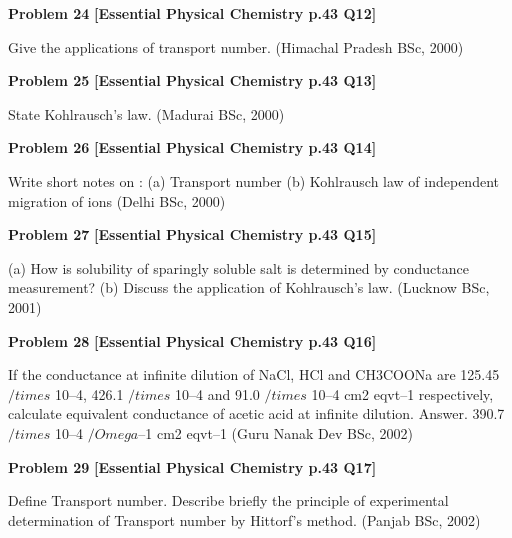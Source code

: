 \begin{problembox}
\textbf{Problem 24} \hfill \textbf{[Essential Physical Chemistry p.43 Q12]}
\label{q:ext-essential_all_questions-24}

Give the applications of transport number.
(Himachal Pradesh BSc, 2000)
\end{problembox}

\begin{problembox}
\textbf{Problem 25} \hfill \textbf{[Essential Physical Chemistry p.43 Q13]}
\label{q:ext-essential_all_questions-25}

State Kohlrausch's law.
(Madurai BSc, 2000)
\end{problembox}

\begin{problembox}
\textbf{Problem 26} \hfill \textbf{[Essential Physical Chemistry p.43 Q14]}
\label{q:ext-essential_all_questions-26}

Write short notes on :
(a)
Transport number
(b)
Kohlrausch law of independent migration of ions (Delhi BSc, 2000)
\end{problembox}

\begin{problembox}
\textbf{Problem 27} \hfill \textbf{[Essential Physical Chemistry p.43 Q15]}
\label{q:ext-essential_all_questions-27}

(a)
How is solubility of sparingly soluble salt is determined by conductance measurement?
(b)
Discuss the application of Kohlrausch's law.
(Lucknow BSc, 2001)
\end{problembox}

\begin{problembox}
\textbf{Problem 28} \hfill \textbf{[Essential Physical Chemistry p.43 Q16]}
\label{q:ext-essential_all_questions-28}

If the conductance at infinite dilution of NaCl, HCl and CH3COONa are 125.45 $/times$ 10--4, 426.1 $/times$ 10--4 and
91.0 $/times$ 10--4 cm2 eqvt--1 respectively, calculate equivalent conductance of acetic acid at infinite dilution.
Answer. 390.7 $/times$ 10--4 $/Omega$--1 cm2 eqvt--1
(Guru Nanak Dev BSc, 2002)
\end{problembox}

\begin{problembox}
\textbf{Problem 29} \hfill \textbf{[Essential Physical Chemistry p.43 Q17]}
\label{q:ext-essential_all_questions-29}

Define Transport number. Describe briefly the principle of experimental determination of Transport
number by Hittorf's method.
(Panjab BSc, 2002)
\end{problembox}

